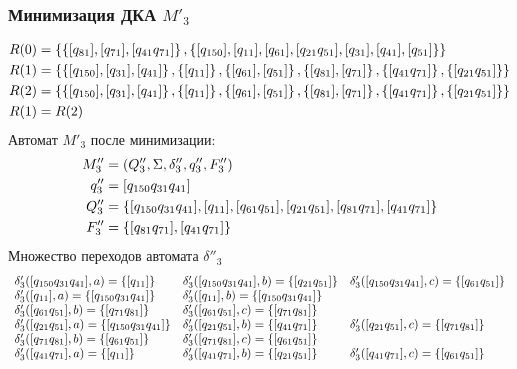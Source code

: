 \subsubsection{Минимизация ДКА \(M'_3\)}
\begin{align*}
	R(0) & = \left\{\left\{[q_{81}], [q_{71}], [q_{41}q_{71}]\right\}, \left\{[q_{150}], [q_{11}],[q_{61}], [q_{21}q_{51}],[q_{31}], [q_{41}],  [q_{51}]\right\}\right\}                             \\
	R(1) & = \left\{\left\{[q_{150}],[q_{31}],[q_{41}]\right\}, \left\{[q_{11}]\right\}, \left\{[q_{61}],[q_{51}]\right\}, \left\{[q_{81}], [q_{71}]\right\}, \left\{ [q_{41}q_{71}]\right\}, \left\{  [q_{21}q_{51}]   \right\}\right\} \\
	R(2) & = \left\{\left\{[q_{150}],[q_{31}],[q_{41}]\right\}, \left\{[q_{11}]\right\}, \left\{[q_{61}],[q_{51}]\right\}, \left\{[q_{81}], [q_{71}]\right\}, \left\{ [q_{41}q_{71}]\right\}, \left\{  [q_{21}q_{51}]   \right\}\right\} \\
	R(1) & = R(2)
\end{align*}
Автомат \(M'_3\) после минимизации:
\begin{align*}
	M''_3 & = \left(Q''_3, \Sigma, \delta''_3, q''_3, F''_3\right)                                                        \\
	q''_3 & = [q_{150}q_{31}q_{41}]                                                                                \\
	Q''_3 & = \left\{[q_{150}q_{31}q_{41}], [q_{11}],[q_{61}q_{51}], [q_{21}q_{51}], [q_{81}q_{71}], [q_{41}q_{71}]\right\} \\
	F''_3 & = \left\{[q_{81}q_{71}], [q_{41}q_{71}]\right\}
\end{align*}
Множество переходов автомата \(\delta''_3\)
\begin{align*}
	\begin{array}{lll}
		\delta'_3([q_{150}q_{31}q_{41}], a) = \left\{[q_{11}]\right\}       & \delta'_3([q_{150}q_{31}q_{41}], b) = \left\{[q_{21}q_{51}]\right\} & \delta'_3([q_{150}q_{31}q_{41}], c) = \left\{[q_{61}q_{51}]\right\} \\
		\delta'_3([q_{11}], a) = \left\{[q_{150}q_{31}q_{41}]\right\}       & \delta'_3([q_{11}], b) = \left\{[q_{150}q_{31}q_{41}]\right\}                                                                    \\
		\delta'_3([q_{61}q_{51}], b) = \left\{[q_{71}q_{81}]\right\}        & \delta'_3([q_{61}q_{51}], c) = \left\{[q_{71}q_{81}]\right\}                                                                     \\
		\delta'_3([q_{21}q_{51}], a) = \left\{[q_{150}q_{31}q_{41}]\right\} & \delta'_3([q_{21}q_{51}], b) = \left\{[q_{41}q_{71}]\right\}        & \delta'_3([q_{21}q_{51}], c) = \left\{[q_{71}q_{81}]\right\}        \\
		\delta'_3([q_{71}q_{81}], b) = \left\{[q_{61}q_{51}]\right\}        & \delta'_3([q_{71}q_{81}], c) = \left\{[q_{61}q_{51}]\right\}                                                                     \\
		\delta'_3([q_{41}q_{71}], a) = \left\{[q_{11}]\right\}              & \delta'_3([q_{41}q_{71}], b) = \left\{[q_{21}q_{51}]\right\}        & \delta'_3([q_{41}q_{71}], c) = \left\{[q_{61}q_{51}]\right\}        \\
	\end{array}
\end{align*}
